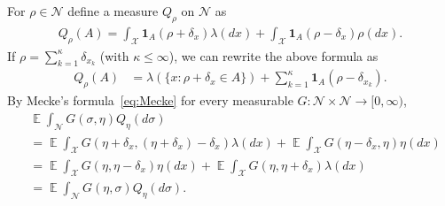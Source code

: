 \documentclass[a4paper]{amsart}
\theoremstyle{definition}
\theoremstyle{remark}
\numberwithin{equation}{section}
\newcommand{\calX}{\mathcal{X}}
\DeclareMathOperator{\EE}{\mathbb{E}} %
\newcommand*{\ind}[1]{\mathbf{1}_{#1}}
\begin{document}
For $\rho \in \mathcal{N}$ define a measure $Q_\rho$ on $\mathcal{N}$ as
\begin{align*}
    Q_\rho(A) = \int_\calX \ind{A}(\rho + \delta_x)\lambda(dx) + \int_\calX \ind{A}(\rho - \delta_{x})\rho(dx).
\end{align*}
If $\rho = \sum_{k=1}^\kappa \delta_{x_k}$ (with $\kappa \le \infty$), we can rewrite the above formula as
\begin{align*}
  Q_\rho(A) &= \lambda(\{x\colon \rho + \delta_x \in A\}) + \sum_{k=1}^\kappa \ind{A}(\rho - \delta_{x_k}).
\end{align*}
By Mecke's formula~\eqref{eq:Mecke} for every measurable $G\colon \mathcal{N}\times \mathcal{N} \to [0,\infty)$,
\begin{align*}
&\EE \int_\mathcal{N} G(\sigma,\eta)Q_\eta(d\sigma) \\
  &= \EE \int_\mathcal{X} G(\eta + \delta_x, (\eta+\delta_x) - \delta_x)\lambda(dx)  + \EE \int_\mathcal{X} G(\eta - \delta_x,\eta)\eta(dx)\\
& = \EE \int_\mathcal{X} G(\eta, \eta-\delta_x)\eta(dx) +  \EE \int_\mathcal{X} G(\eta,\eta+\delta_x)\lambda(dx) \\
&= \EE \int_\mathcal{N} G(\eta,\sigma)Q_\eta(d\sigma).
\end{align*}
\end{document}
